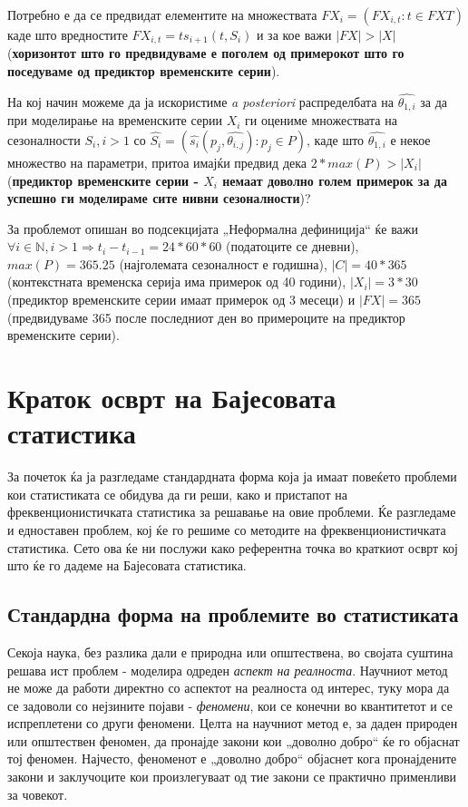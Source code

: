 \documentclass[12pt]{article}
\numberwithin{equation}{section}
\begin{document}
Потребно е да се предвидат елементите на множествата \(FX_i = (FX_{i,t}: t \in FXT)\) каде што вредностите \(FX_{i,t} = ts_{i+1}(t, S_i)\) и за кое важи \(\lvert FX \rvert > \lvert X \rvert \) (\textbf{хоризонтот што го предвидуваме е поголем од примерокот што го поседуваме од предиктор временските серии}).

На кој начин можеме да ја искористиме \textit{a posteriori} распределбата на \(\widehat{\theta_{1, i}}\) за да при моделирање на временските серии \(X_i\) ги оцениме множествата на сезоналности \(S_i, i > 1\) со \(\widehat{S_i} = (\widehat{s_i}(p_j, \widehat{\theta_{i, j}}): p_j \in P)\), каде што \(\widehat{\theta_{1, i}}\) е некое множество на параметри, притоа имајќи предвид дека \(2 * max(P) > \lvert X_i \rvert\) (\textbf{предиктор временските серии - \(X_i\) немаат доволно голем примерок за да успешно ги моделираме сите нивни сезоналности})?

За проблемот опишан во подсекцијата „Неформална дефиниција“ ќе важи \(\forall i \in \mathbb{N}, i > 1 \Rightarrow t_i - t_{i-1} = 24 * 60 * 60 \) (податоците се дневни), \(max(P) = 365.25\) (најголемата сезоналност е годишна), \(\lvert C \rvert = 40 * 365\) (контекстната временска серија има примерок од 40 години), \(\lvert X_i \rvert = 3 * 30\) (предиктор временските серии имаат примерок од 3 месеци) и \(\lvert FX \rvert = 365\) (предвидуваме 365 после последниот ден во примероците на предиктор временските серии).

\newpage

\section{Краток осврт на Бајесовата статистика}

За почеток ќа ја разгледаме стандардната форма која ја имаат повеќето проблеми кои статистиката се обидува да ги реши, како и пристапот на фреквенционистичката статистика за решавање на овие проблеми. Ќе разгледаме и едноставен проблем, кој ќе го решиме со методите на фреквенционистичката статистика. Сето ова ќе ни послужи како референтна точка во краткиот осврт кој што ќе го дадеме на Бајесовата статистика.

\subsection{Стандардна форма на проблемите во статистиката}

Секоја наука, без разлика дали е природна или општествена, во својата суштина решава ист проблем - моделира одреден \textit{аспект на реалноста}. Научниот метод не може да работи директно со аспектот на реалноста од интерес, туку мора да се задоволи со нејзините појави - \textit{феномени}, кои се конечни во квантитетот и се испреплетени со други феномени. Целта на научниот метод е, за даден природен или општествен феномен, да пронајде закони кои „доволно добро“ ќе го објаснат тој феномен. Најчесто, феноменот е „доволно добро“ објаснет кога пронајдените закони и заклучоците кои произлегуваат од тие закони се практично применливи за човекот.
\end{document}
